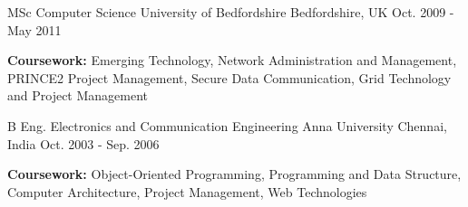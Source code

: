 
\begin{cventries}

  \cventry
  {MSc Computer Science} %
  {University of Bedfordshire} %
  {Bedfordshire, UK} %
  {Oct. 2009 - May 2011} %
  {
    \begin{cvitems} %
    \item {\textbf{Coursework:} Emerging Technology, Network Administration and Management, PRINCE2 Project Management, Secure Data Communication, Grid Technology and Project Management}
    \end{cvitems}
  }

  \cventry
  {B Eng. Electronics and Communication Engineering} %
  {Anna University} %
  {Chennai, India} %
  {Oct. 2003 - Sep. 2006} %
  {
    \begin{cvitems} %
    \item {\textbf{Coursework:} Object-Oriented Programming, Programming and Data Structure, Computer Architecture, Project Management, Web Technologies}
    \end{cvitems}
  }
\end{cventries}
